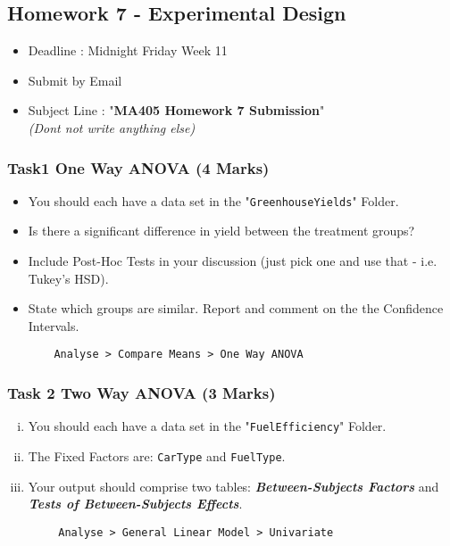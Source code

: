 \documentclass[a4paper,12pt]{article}
\begin{document}
\subsection*{Homework 7 - Experimental Design}

	\begin{framed}
		\begin{itemize}
			\item Deadline : Midnight Friday Week 11
			\item Submit by Email
			\item Subject Line : "\textbf{MA405 Homework 7 Submission}" \\ \textit{(Dont not write anything else)}
		\end{itemize}
	\end{framed}
\subsubsection*{Task1 One Way ANOVA (4 Marks) }
\begin{itemize}
	\item You should each have a data set in the "\texttt{GreenhouseYields}" Folder.
	\item Is there a significant difference in yield between the treatment groups?
	\item Include Post-Hoc Tests in your discussion (just pick one and use that - i.e. Tukey's HSD). 
	\item State which groups are similar. Report and comment on the the Confidence Intervals.
	\begin{framed}
	\begin{verbatim}
	Analyse > Compare Means > One Way ANOVA
	\end{verbatim}
	\end{framed}
\end{itemize}
\bigskip
\subsubsection*{Task 2 Two Way ANOVA (3 Marks) }
\begin{enumerate}[(i)]
	\item You should each have a data set in the "\texttt{FuelEfficiency}" Folder.
	\item The Fixed Factors are: \texttt{CarType} and \texttt{FuelType}.
\item Your output should comprise two tables: \textbf{\textit{Between-Subjects Factors}} and \textbf{\textit{Tests of Between-Subjects Effects}}.
\end{enumerate}
	\begin{framed}
		\begin{verbatim}
		Analyse > General Linear Model > Univariate
		\end{verbatim}
	\end{framed}
\newpage
\end{document}
